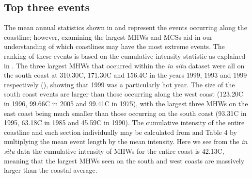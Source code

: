 \documentclass[a4paper,10pt,review]{elsarticle}
\begin{document}
\subsection{Top three events}
The mean annual statistics shown in  and  represent the events occurring along the coastline; however, examining the largest MHWs and MCSs aid in our understanding of which coastlines may have the most extreme events. The ranking of these events is based on the cumulative intensity statistic as explained in . The three largest MHWs that occurred within the \emph{in situ} dataset were all on the south coast at 310.30\degree C, 171.30\degree C and 156.4\degree C in the years 1999, 1993 and 1999 respectively (), showing that 1999 was a particularly hot year. The size of the south coast events are larger than those occurring along the west coast (123.20\degree C in 1996, 99.66\degree C in 2005 and 99.41\degree C in 1975), with the largest three MHWs on the east coast being much smaller than those occurring on the south coast (93.31\degree C in 1995, 63.18\degree C in 1985 and 45.59\degree C in 1990). The cumulative intensity of the entire coastline and each section individually may be calculated from  and Table 4  by multiplying the mean event length by the mean intensity. Here we see from the \emph{in situ} data the cumulative intensity of MHWs for the entire coast is 42.13\degree C, meaning that the largest MHWs seen on the south and west coasts are massively larger than the coastal average.
\end{document}
